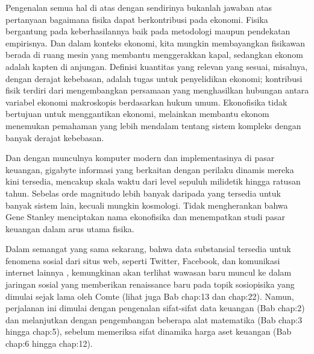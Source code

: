 \documentclass[a4paper,12pt]{book}
\begin{document}
Pengenalan semua hal di atas dengan sendirinya bukanlah jawaban atas pertanyaan bagaimana fisika dapat berkontribusi pada ekonomi. Fisika bergantung pada keberhasilannya baik pada metodologi maupun pendekatan empirisnya. Dan dalam konteks ekonomi, kita mungkin membayangkan fisikawan berada di ruang mesin yang membantu menggerakkan kapal, sedangkan ekonom adalah kapten di anjungan. Definisi kuantitas yang relevan yang sesuai, misalnya, dengan derajat kebebasan, adalah tugas untuk penyelidikan ekonomi; kontribusi fisik terdiri dari mengembangkan persamaan yang menghasilkan hubungan antara variabel ekonomi makroskopis berdasarkan hukum umum. Ekonofisika tidak bertujuan untuk menggantikan ekonomi, melainkan membantu ekonom menemukan pemahaman yang lebih mendalam tentang sistem kompleks dengan banyak derajat kebebasan.

Dan dengan munculnya komputer modern dan implementasinya di pasar keuangan, gigabyte informasi yang berkaitan dengan perilaku dinamis mereka kini tersedia, mencakup skala waktu dari level sepuluh milidetik \cite{preis2010} hingga ratusan tahun. Sebelas orde magnitudo lebih banyak daripada yang tersedia untuk banyak sistem lain, kecuali mungkin kosmologi. Tidak mengherankan bahwa Gene Stanley menciptakan nama ekonofisika dan menempatkan studi pasar keuangan dalam arus utama fisika.

Dalam semangat yang sama sekarang, bahwa data substansial tersedia untuk fenomena sosial dari situs web, seperti Twitter, Facebook, dan komunikasi internet lainnya \cite{caldarelli2007, hardiman2009}, kemungkinan akan terlihat wawasan baru muncul ke dalam jaringan sosial yang memberikan renaissance baru pada topik sosiopisika yang dimulai sejak lama oleh Comte (lihat juga Bab  {chap:13} dan  {chap:22}). Namun, perjalanan ini dimulai dengan pengenalan sifat-sifat data keuangan (Bab  {chap:2}) dan melanjutkan dengan pengembangan beberapa alat matematika (Bab  {chap:3} hingga  {chap:5}), sebelum memeriksa sifat dinamika harga aset keuangan (Bab  {chap:6} hingga  {chap:12}).
\end{document}
